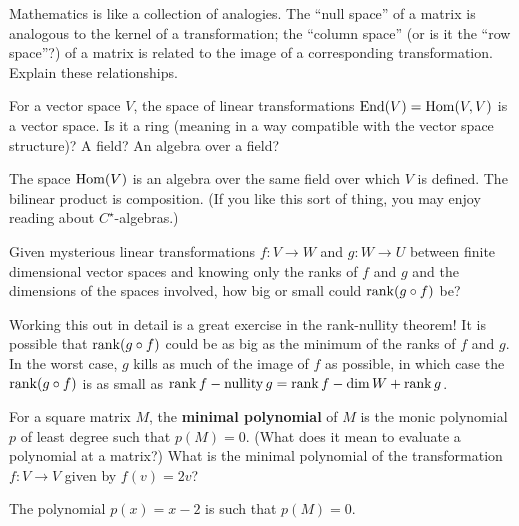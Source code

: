 \documentclass{homework}
\begin{document}
\begin{problem}
  Mathematics is like a collection of analogies.  The ``null space''
  of a matrix is analogous to the kernel of a transformation; the
  ``column space'' (or is it the ``row space''?) of a matrix is
  related to the image of a corresponding transformation.  Explain these relationships.
\end{problem}

\begin{problem}
  For a vector space $V$, the space of linear transformations
  $\operatorname{End}(V) = \operatorname{Hom}(V,V)$ is a vector space.  Is it a ring (meaning in a
  way compatible with the vector space structure)?  A field?  An
  algebra over a field?
\end{problem}

\begin{solution}
  The space $\operatorname{Hom}(V)$ is an algebra over the same field over which $V$
  is defined.  The bilinear product is composition.  (If you like this
  sort of thing, you may enjoy reading about $C^\star$-algebras.)
\end{solution}

\begin{problem}
  Given mysterious linear transformations $f : V \to W$ and
  $g : W \to U$ between finite dimensional vector spaces and knowing
  only the ranks of $f$ and $g$ and the dimensions of the spaces
  involved, how big or small could $\operatorname{rank} (g \circ f)$ be?
\end{problem}

\begin{solution}
  Working this out in detail is a great exercise in the rank-nullity
  theorem!  It is possible that $\operatorname{rank} (g \circ f)$ could be as big as
  the minimum of the ranks of $f$ and $g$.  In the worst case, $g$
  kills as much of the image of $f$ as possible, in which case the
  $\operatorname{rank} (g \circ f)$ is as small as
  $\operatorname{rank} f - \operatorname{nullity} g = \operatorname{rank} f - \dim W + \operatorname{rank} g$.
\end{solution}

\begin{problem}\label{definition-minimal-polynomial}For a square matrix $M$, the \textbf{minimal polynomial} of $M$ is
  the monic polynomial $p$ of least degree such that $p(M) = 0$.
  (What does it mean to evaluate a polynomial at a matrix?)  What is
  the minimal polynomial of the transformation $f : V \to V$ given by
  $f(v) = 2v$?
\end{problem}

\begin{solution}
  The polynomial $p(x) = x - 2$ is such that $p(M) = 0$.
\end{solution}
\end{document}

